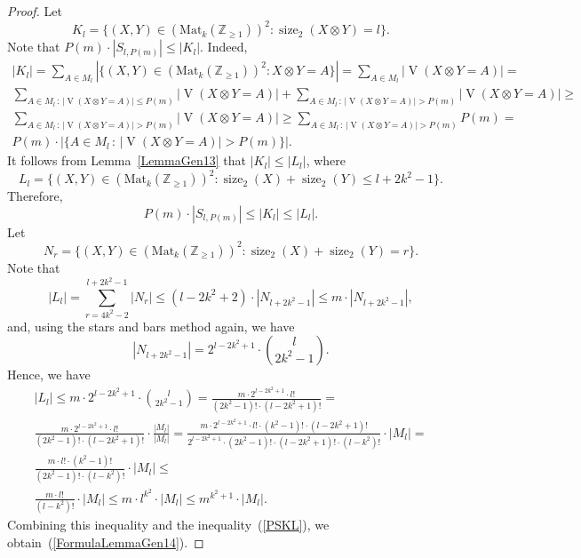 \documentclass[10pt,a4paper]{amsart}
\newcommand{\Mat}{\mathrm{Mat}}
\DeclareMathOperator{\V}{\mathrm{V}}
\DeclareMathOperator{\size}{size}
\begin{document}
\begin{proof}
Let 
$$
K_l = \{(X, Y) \in (\Mat_k(\mathbb{Z}_{\geq 1}))^2 : \size_2(X \otimes Y) = l\}.
$$
Note that $P(m) \cdot |S_{l, P(m)}| \leq |K_l|$.
Indeed,
\begin{multline*}
|K_l| = \sum_{A \in M_l}|\{(X, Y) \in (\Mat_k(\mathbb{Z}_{\geq 1}))^2 : X \otimes Y = A\}| =
\sum_{A \in M_l}|\!\V(X \otimes Y = A)| = \\
\sum_{A \in M_l \,:\, |\!\V(X \otimes Y = A)| \leq P(m)}|\!\V(X \otimes Y = A)| +
\sum_{A \in M_l \,:\, |\!\V(X \otimes Y = A)| > P(m)}|\!\V(X \otimes Y = A)| \geq \\
\sum_{A \in M_l \,:\, |\!\V(X \otimes Y = A)| > P(m)}|\!\V(X \otimes Y = A)| \geq 
\sum_{A \in M_l \,:\, |\!\V(X \otimes Y = A)| > P(m)} P(m) =\\
P(m) \cdot |\{A \in M_l \,:\, |\!\V(X \otimes Y = A)| > P(m)\}|.
\end{multline*}
It follows from Lemma~\ref{LemmaGen13} that
$|K_l| \leq |L_{l}|$, where
$$
L_l = \{(X, Y) \in (\Mat_k(\mathbb{Z}_{\geq 1}))^2 : \size_2(X) + \size_2(Y) \leq l + 2k^2 - 1\}.
$$
Therefore,
\begin{equation}\label{PSKL}
P(m) \cdot |S_{l, P(m)}| \leq |K_l| \leq |L_{l}|.    
\end{equation}
Let
$$
N_r = \{(X, Y) \in (\Mat_k(\mathbb{Z}_{\geq 1}))^2 : \size_2(X) + \size_2(Y) = r\}.
$$
Note that
$$
|L_{l}| =
\sum_{r = 4k^2 - 2}^{l + 2k^2 - 1} |N_r| \leq (l - 2k^2 + 2) \cdot |N_{l + 2k^2 - 1}| \leq m \cdot |N_{l + 2k^2 - 1}|,
$$
and, using the stars and bars method again, we have
$$
|N_{l + 2k^2 - 1}| = 2^{l - 2k^2 + 1}\cdot \binom{l}{2k^2 - 1}.
$$
Hence, we have
\begin{multline*}
|L_{l}| \leq
m \cdot 2^{l - 2k^2 + 1}\cdot \binom{l}{2k^2 - 1} =
\frac{m \cdot 2^{l - 2k^2 + 1}\cdot l!}{(2k^2 - 1)!\cdot(l - 2k^2 + 1)!} = \\
\frac{m \cdot 2^{l - 2k^2 + 1}\cdot l!}{(2k^2 - 1)!\cdot (l - 2k^2 + 1)!} \cdot \frac{|M_l|}{|M_l|}= 
\frac{m \cdot 2^{l - 2k^2 + 1}\cdot l! \cdot (k^2 - 1)! \cdot (l - 2k^2 + 1)!}{2^{l - 2k^2 + 1}\cdot(2k^2 - 1)!\cdot(l - 2k^2 + 1)!\cdot(l - k^2)!} \cdot |M_l|= \\
\frac{m \cdot l! \cdot (k^2 - 1)!}{(2k^2 - 1)!\cdot(l - k^2)!} \cdot |M_l|\leq\\
\frac{m \cdot l!}{(l - k^2)!} \cdot |M_l|\leq
m \cdot l^{k^2} \cdot |M_l|\leq
 m^{k^2 + 1} \cdot |M_l|.
\end{multline*}
Combining this inequality and the inequality~(\ref{PSKL}), we obtain~(\ref{FormulaLemmaGen14}).
\end{proof}
\end{document}
